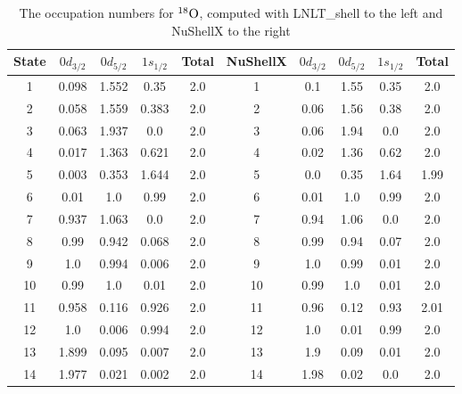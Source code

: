 \begin{table}[ht!]
\caption{The occupation numbers for \(^{18}\rm{O}\), computed with LNLT\_shell to the left and NuShellX to the right}
\label{tab:ox18occ}
\begin{tabular}{c|ccc|c||c|ccc|c}
\hline State & $0d_{3/2}$ & $0d_{5/2}$ & $1s_{1/2}$ & Total & NuShellX & $0d_{3/2}$ & $0d_{5/2}$ & $1s_{1/2}$ & Total \\
\hline 1 & 0.098 & 1.552 & 0.35 & 2.0 & 1 & 0.1 & 1.55 & 0.35 & 2.0 \\
 2 & 0.058 & 1.559 & 0.383 & 2.0 & 2 & 0.06 & 1.56 & 0.38 & 2.0 \\
 3 & 0.063 & 1.937 & 0.0 & 2.0 & 3 & 0.06 & 1.94 & 0.0 & 2.0 \\
 4 & 0.017 & 1.363 & 0.621 & 2.0 & 4 & 0.02 & 1.36 & 0.62 & 2.0 \\
 5 & 0.003 & 0.353 & 1.644 & 2.0 & 5 & 0.0 & 0.35 & 1.64 & 1.99 \\
 6 & 0.01 & 1.0 & 0.99 & 2.0 & 6 & 0.01 & 1.0 & 0.99 & 2.0 \\
 7 & 0.937 & 1.063 & 0.0 & 2.0 & 7 & 0.94 & 1.06 & 0.0 & 2.0 \\
 8 & 0.99 & 0.942 & 0.068 & 2.0 & 8 & 0.99 & 0.94 & 0.07 & 2.0 \\
 9 & 1.0 & 0.994 & 0.006 & 2.0 & 9 & 1.0 & 0.99 & 0.01 & 2.0 \\
 10 & 0.99 & 1.0 & 0.01 & 2.0 & 10 & 0.99 & 1.0 & 0.01 & 2.0 \\
 11 & 0.958 & 0.116 & 0.926 & 2.0 & 11 & 0.96 & 0.12 & 0.93 & 2.01 \\
 12 & 1.0 & 0.006 & 0.994 & 2.0 & 12 & 1.0 & 0.01 & 0.99 & 2.0 \\
 13 & 1.899 & 0.095 & 0.007 & 2.0 & 13 & 1.9 & 0.09 & 0.01 & 2.0 \\
 14 & 1.977 & 0.021 & 0.002 & 2.0 & 14 & 1.98 & 0.02 & 0.0 & 2.0 \\
\hline
\end{tabular}
\end{table}
